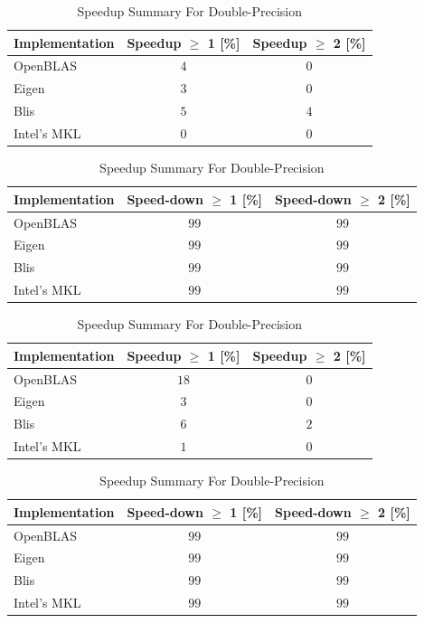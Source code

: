 \begin{table}[ht]
    \centering
    \caption{Speedup Summary For Single-Precision}
    \begin{tabular}{|l|c|c|}
        \hline
        \textbf{Implementation} & \textbf{Speedup $\geq$ 1 [\%]} & \textbf{Speedup $\geq$ 2 [\%]}\\
        \hline
        OpenBLAS    & $4$ & $0$ \\
        \hline
        Eigen       & $3$ & $0$ \\
        \hline
        Blis        & $5$ & $4$ \\
        \hline
        Intel's MKL & $0$ & $0$ \\
        \hline
    \end{tabular}
    
    \begin{tabular}{|l|c|c|}
        \hline
        \textbf{Implementation} & \textbf{Speed-down $\geq$ 1 [\%]} & \textbf{Speed-down $\geq$ 2 [\%]}\\
        \hline
        OpenBLAS    & $99$ & $99$ \\
        \hline
        Eigen       & $99$ & $99$ \\
        \hline
        Blis        & $99$ & $99$ \\
        \hline
        Intel's MKL & $99$ & $99$ \\
        \hline
    \end{tabular}
    
    \vspace*{1 cm}

    \centering
    \caption{Speedup Summary For Double-Precision}
    \begin{tabular}{|l|c|c|}
        \hline
        \textbf{Implementation} & \textbf{Speedup $\geq$ 1 [\%]} & \textbf{Speedup $\geq$ 2 [\%]}\\
        \hline
        OpenBLAS    & $18$ & $0$ \\
        \hline
        Eigen       & $3$ & $0$ \\
        \hline
        Blis        & $6$ & $2$ \\
        \hline
        Intel's MKL & $1$ & $0$ \\
        \hline
    \end{tabular}
    
    \begin{tabular}{|l|c|c|}
        \hline
        \textbf{Implementation} & \textbf{Speed-down $\geq$ 1 [\%]} & \textbf{Speed-down $\geq$ 2 [\%]}\\
        \hline
        OpenBLAS    & $99$ & $99$ \\
        \hline
        Eigen       & $99$ & $99$ \\
        \hline
        Blis        & $99$ & $99$ \\
        \hline
        Intel's MKL & $99$ & $99$ \\
        \hline
    \end{tabular}
\end{table}

